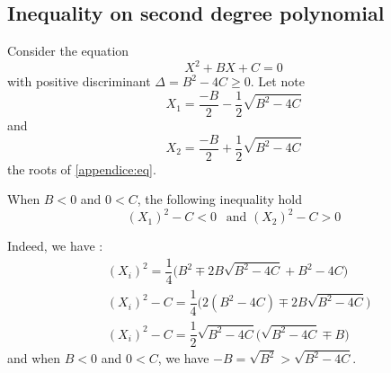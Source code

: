\documentclass{article}
\begin{document}
\begin{appendices}
\section{Inequality on second degree polynomial \label{appendice:ineq2nd}}

Consider the equation
\begin{equation}
X^2 + B X + C = 0
\label{appendice:eq}
\end{equation}
with positive discriminant $\Delta = B^2 - 4C \geq 0$. Let note $$X_{1} = \dfrac{-B}{2} - \dfrac{1}{2} \sqrt{B^2 - 4 C}$$ and $$X_2 = \dfrac{-B}{2} + \dfrac{1}{2} \sqrt{B^2 - 4 C}$$  the roots of \eqref{appendice:eq}.

When $B < 0$ and $0 < C$, the following inequality hold
\begin{equation}
(X_1) ^ 2 - C < 0 \:\:\text{ and } (X_2)^2 - C > 0
\end{equation}

Indeed, we have :
\begin{subequations}
\begin{align}
&(X_i) ^2 = \dfrac{1}{4} \Big(B^2 \mp 2 B\sqrt{B^2 - 4C} + B^2 - 4C \Big) \\
&(X_i)^2 - C = \dfrac{1}{4} \Big(2(B^2 - 4C) \mp 2B \sqrt{B^2 - 4C} \Big) \\
&(X_i)^2 - C = \dfrac{1}{2} \sqrt{B^2 - 4C} \Big( \sqrt{B^2 - 4C} \mp B \Big)
\end{align}
\end{subequations}
and when $B < 0$ and $0 < C$, we have $ -B = \sqrt{B^2} > \sqrt{B^2 - 4C}$.


\end{appendices}
\end{document}
